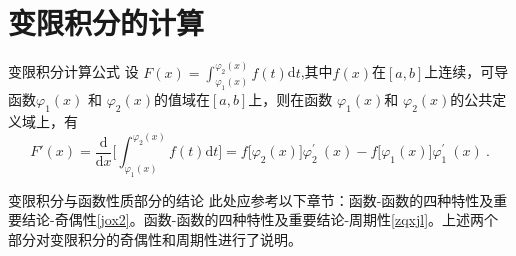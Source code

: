 \documentclass[8pt a4paper, oneside, UTF8]{ctexbook}
\begin{document}
\begin{sloppypar}
    \section{变限积分的计算}
    \begin{defn}{变限积分计算公式}{}
        设 $F(x)=\int_{\varphi_{1}(x)}^{\varphi_{2}(x)}f(t)$d$t$,其中$f(x)$在$[a,b]$上连续，可导函数$\varphi_1(x)$ 和 $\varphi_{2}(x)$的值域在$[a,b]$上，则在函数 $\varphi_{1}(x)$和 $\varphi_{2}(x)$的公共定义域上，有
        $$F'(x)=\frac{\mathrm{d}}{\mathrm{d}x}\biggl[\int_{\varphi_{1}(x)}^{\varphi_{2}(x)}f(t)\mathrm{d}t\biggr]=f\bigl[\varphi_{2}(x)\bigr]\varphi_{2}^{\prime}\:(x)-f\bigl[\varphi_{1}(x)\bigr]\varphi_{1}^{\prime}\:(x)\:.$$
    \end{defn}
    \begin{conclusion}{变限积分与函数性质部分的结论}{}
        此处应参考以下章节：函数-函数的四种特性及重要结论-奇偶性\ref{jox2}。函数-函数的四种特性及重要结论-周期性\ref{zqxjl}。上述两个部分对变限积分的奇偶性和周期性进行了说明。
    \end{conclusion}
    \ifx\allfiles\undefined
\end{sloppypar}
\end{document}
